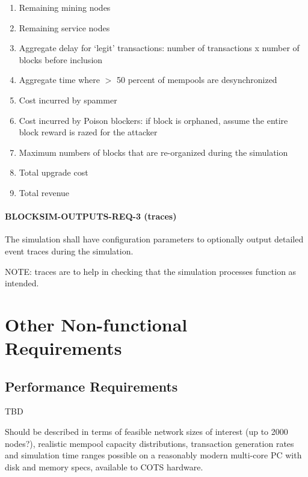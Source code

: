 \documentclass{scrreprt}
\begin{document}
        \begin{enumerate}
          \item Remaining mining nodes
          \item Remaining service nodes
          \item Aggregate delay for `legit' transactions: number of
            transactions x
            number of blocks before inclusion
          \item Aggregate time where $>$ 50 percent of mempools are
            desynchronized
          \item Cost incurred by spammer
          \item Cost incurred by Poison blockers: if block is orphaned, assume
            the
            entire block reward is razed for the attacker
          \item Maximum numbers of blocks that are re-organized during the
            simulation
          \item Total upgrade cost
          \item Total revenue
        \end{enumerate}

      \subsubsection{BLOCKSIM-OUTPUTS-REQ-3 (traces)}

        The simulation shall have configuration parameters to optionally
        output detailed event traces during the simulation.

        NOTE: traces are to help in checking that the simulation processes
        function as intended.

\chapter{Other Non-functional Requirements}

  \section{Performance Requirements}

    TBD

    Should be described in terms of feasible network sizes of interest (up to
    2000 nodes?), realistic mempool capacity distributions,
    transaction generation rates and simulation time ranges possible on a
    reasonably modern multi-core PC with disk and memory specs,
    available to COTS hardware.
\end{document}
